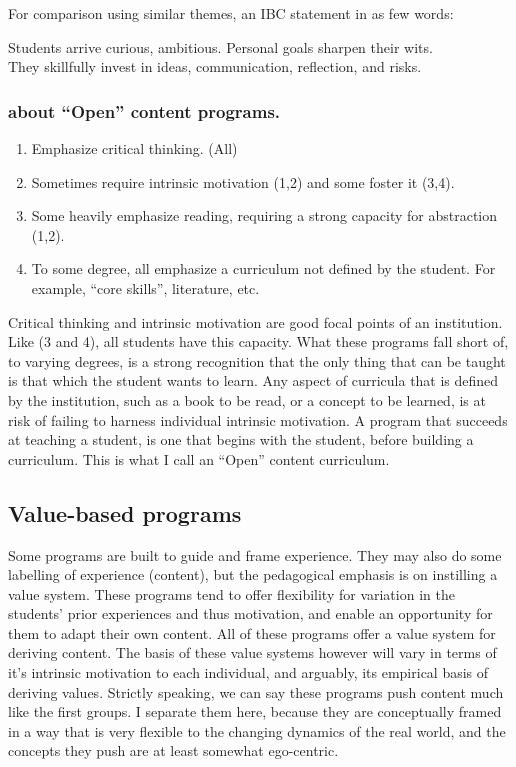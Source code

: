 \documentclass[
]{book}
\providecommand{\tightlist}{%
  \setlength{\itemsep}{0pt}\setlength{\parskip}{0pt}}
\begin{document}
For comparison using similar themes, an IBC statement in as few words:

Students arrive curious, ambitious. Personal goals sharpen their wits.\\
They skillfully invest in ideas, communication, reflection, and risks.

\subsubsection{about ``Open'' content programs.}\label{about-open-content-programs.}

\begin{enumerate}
\def\labelenumi{\arabic{enumi}.}
\tightlist
\item
  Emphasize critical thinking. (All)
\item
  Sometimes require intrinsic motivation (1,2) and some foster it (3,4).
\item
  Some heavily emphasize reading, requiring a strong capacity for abstraction (1,2).
\item
  To some degree, all emphasize a curriculum not defined by the student. For example, ``core skills'', literature, etc.
\end{enumerate}

Critical thinking and intrinsic motivation are good focal points of an institution. Like (3 and 4), all students have this capacity. What these programs fall short of, to varying degrees, is a strong recognition that the only thing that can be taught is that which the student wants to learn. Any aspect of curricula that is defined by the institution, such as a book to be read, or a concept to be learned, is at risk of failing to harness individual intrinsic motivation. A program that succeeds at teaching a student, is one that begins with the student, before building a curriculum. This is what I call an ``Open'' content curriculum.

\subsection{Value-based programs}\label{value-based-programs}

Some programs are built to guide and frame experience. They may also do some labelling of experience (content), but the pedagogical emphasis is on instilling a value system. These programs tend to offer flexibility for variation in the students' prior experiences and thus motivation, and enable an opportunity for them to adapt their own content. All of these programs offer a value system for deriving content. The basis of these value systems however will vary in terms of it's intrinsic motivation to each individual, and arguably, its empirical basis of deriving values. Strictly speaking, we can say these programs push content much like the first groups. I separate them here, because they are conceptually framed in a way that is very flexible to the changing dynamics of the real world, and the concepts they push are at least somewhat ego-centric.
\end{document}
